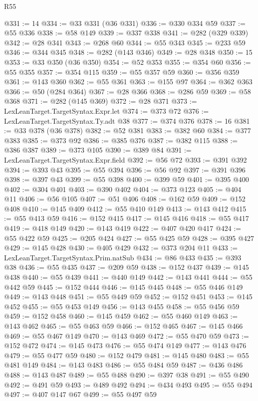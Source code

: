 \begin{lexlean}{R55}
\begin{coremodule}
@331 := 14
@334 := @33 @331 (@36 @331)
@336 := @330 @334 @59
@337 := @55 @336
@338 := @58 @149
@339 := @337 @338
@341 := @282 (@329 @339)
@342 := @28 @341
@343 := @268 @60
@344 := @55 @343
@345 := @233 @59
@346 := @344 @345
@348 := @282 (@143 @346)
@349 := @28 @348
@350 := 15
@353 := @33 @350 (@36 @350)
@354 := @52 @353
@355 := @354 @60
@356 := @55 @355
@357 := @354 @115
@359 := @55 @357 @59
@360 := @356 @359
@361 := @143 @360
@362 := @55 @361
@363 := @155 @97
@364 := @362 @363
@366 := @50 (@284 @364)
@367 := @28 @366
@368 := @286 @59
@369 := @58 @368
@371 := @282 (@145 @369)
@372 := @28 @371
@373 := LexLeanTarget.TargetSyntax.Expr.let
@374 := @373 @72
@376 := LexLeanTarget.TargetSyntax.Ty.adt @38
@377 := @374 @376
@378 := 16
@381 := @33 @378 (@36 @378)
@382 := @52 @381
@383 := @382 @60
@384 := @377 @383
@385 := @373 @92
@386 := @385 @376
@387 := @382 @115
@388 := @386 @387
@389 := @373 @105
@390 := @389 @84
@391 := LexLeanTarget.TargetSyntax.Expr.field
@392 := @56 @72
@393 := @391 @392
@394 := @393 @43
@395 := @55 @394
@396 := @56 @92
@397 := @391 @396
@398 := @397 @43
@399 := @55 @398
@400 := @399 @59
@401 := @395 @400
@402 := @304 @401
@403 := @390 @402
@404 := @373 @123
@405 := @404 @11
@406 := @56 @105
@407 := @51 @406
@408 := @162 @59
@409 := @152 @408
@410 := @145 @409
@412 := @55 @410 @149
@413 := @143 @412
@415 := @55 @413 @59
@416 := @152 @415
@417 := @145 @416
@418 := @55 @417
@419 := @418 @149
@420 := @143 @419
@422 := @407 @420 @417
@424 := @55 @422 @59
@425 := @205 @424
@427 := @55 @425 @59
@428 := @395 @427
@429 := @145 @428
@430 := @405 @429
@432 := @373 @204 @11
@433 := LexLeanTarget.TargetSyntax.Prim.natSub
@434 := @86 @433
@435 := @393 @38
@436 := @55 @435
@437 := @209 @59
@438 := @152 @437
@439 := @145 @438
@440 := @55 @439
@441 := @440 @149
@442 := @143 @441
@444 := @55 @442 @59
@445 := @152 @444
@446 := @145 @445
@448 := @55 @446 @149
@449 := @143 @448
@451 := @55 @449 @59
@452 := @152 @451
@453 := @145 @452
@455 := @55 @453 @149
@456 := @143 @455
@458 := @55 @456 @59
@459 := @152 @458
@460 := @145 @459
@462 := @55 @460 @149
@463 := @143 @462
@465 := @55 @463 @59
@466 := @152 @465
@467 := @145 @466
@469 := @55 @467 @149
@470 := @143 @469
@472 := @55 @470 @59
@473 := @152 @472
@474 := @145 @473
@476 := @55 @474 @149
@477 := @143 @476
@479 := @55 @477 @59
@480 := @152 @479
@481 := @145 @480
@483 := @55 @481 @149
@484 := @143 @483
@486 := @55 @484 @59
@487 := @436 @486
@488 := @143 @487
@489 := @55 @488
@490 := @397 @38
@491 := @55 @490
@492 := @491 @59
@493 := @489 @492
@494 := @434 @493
@495 := @55 @494
@497 := @407 @147 @67
@499 := @55 @497 @59

\end{coremodule}
\end{lexlean}
